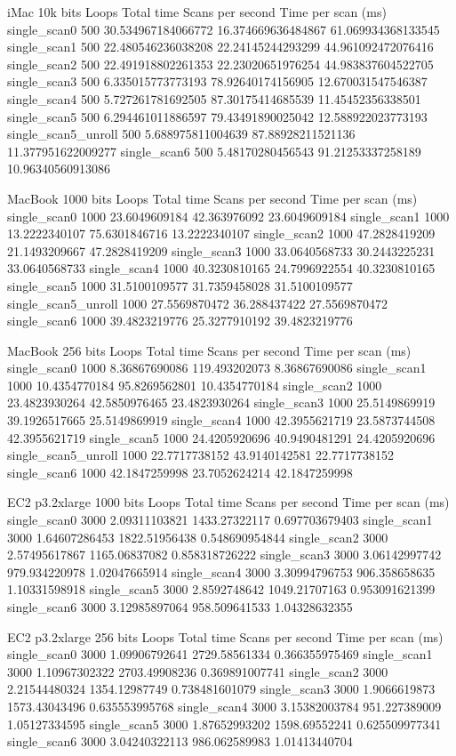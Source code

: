 iMac 10k bits
Loops	Total time	Scans per second	Time per scan (ms)
single\_scan0	500	30.534967184066772	16.374669636484867	61.069934368133545
single\_scan1	500	22.480546236038208	22.24145244293299	44.961092472076416
single\_scan2	500	22.491918802261353	22.23020651976254	44.983837604522705
single\_scan3	500	6.335015773773193	78.92640174156905	12.670031547546387
single\_scan4	500	5.727261781692505	87.30175414685539	11.45452356338501
single\_scan5	500	6.294461011886597	79.43491890025042	12.588922023773193
single\_scan5\_unroll	500	5.688975811004639	87.88928211521136	11.377951622009277
single\_scan6	500	5.48170280456543	91.21253337258189	10.96340560913086


MacBook 1000 bits
Loops	Total time	Scans per second	Time per scan (ms)
single\_scan0	1000	23.6049609184	42.363976092	23.6049609184
single\_scan1	1000	13.2222340107	75.6301846716	13.2222340107
single\_scan2	1000	47.2828419209	21.1493209667	47.2828419209
single\_scan3	1000	33.0640568733	30.2443225231	33.0640568733
single\_scan4	1000	40.3230810165	24.7996922554	40.3230810165
single\_scan5	1000	31.5100109577	31.7359458028	31.5100109577
single\_scan5\_unroll	1000	27.5569870472	36.288437422	27.5569870472
single\_scan6	1000	39.4823219776	25.3277910192	39.4823219776


MacBook 256 bits
Loops	Total time	Scans per second	Time per scan (ms)
single\_scan0	1000	8.36867690086	119.493202073	8.36867690086
single\_scan1	1000	10.4354770184	95.8269562801	10.4354770184
single\_scan2	1000	23.4823930264	42.5850976465	23.4823930264
single\_scan3	1000	25.5149869919	39.1926517665	25.5149869919
single\_scan4	1000	42.3955621719	23.5873744508	42.3955621719
single\_scan5	1000	24.4205920696	40.9490481291	24.4205920696
single\_scan5\_unroll	1000	22.7717738152	43.9140142581	22.7717738152
single\_scan6	1000	42.1847259998	23.7052624214	42.1847259998


EC2 p3.2xlarge 1000 bits
Loops	Total time	Scans per second	Time per scan (ms)
single\_scan0	3000	2.09311103821	1433.27322117	0.697703679403
single\_scan1	3000	1.64607286453	1822.51956438	0.548690954844
single\_scan2	3000	2.57495617867	1165.06837082	0.858318726222
single\_scan3	3000	3.06142997742	979.934220978	1.02047665914
single\_scan4	3000	3.30994796753	906.358658635	1.10331598918
single\_scan5	3000	2.8592748642	1049.21707163	0.953091621399
single\_scan6	3000	3.12985897064	958.509641533	1.04328632355


EC2 p3.2xlarge 256 bits
Loops	Total time	Scans per second	Time per scan (ms)
single\_scan0	3000	1.09906792641	2729.58561334	0.366355975469
single\_scan1	3000	1.10967302322	2703.49908236	0.369891007741
single\_scan2	3000	2.21544480324	1354.12987749	0.738481601079
single\_scan3	3000	1.9066619873	1573.43043496	0.635553995768
single\_scan4	3000	3.15382003784	951.227389009	1.05127334595
single\_scan5	3000	1.87652993202	1598.69552241	0.625509977341
single\_scan6	3000	3.04240322113	986.062589983	1.01413440704


